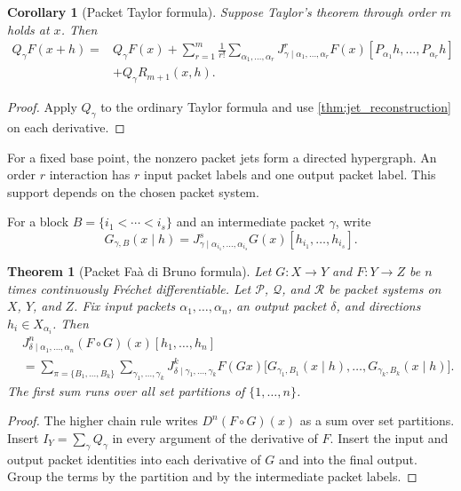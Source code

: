 \documentclass{aomart}
\newtheorem{theorem}{Theorem}[section]
\newtheorem{corollary}[corollary]{Corollary}
\theoremstyle{definition}
\theoremstyle{remark}
\newcommand{\Pcal}{\mathcal P}
\newcommand{\Qcal}{\mathcal Q}
\newcommand{\Rcal}{\mathcal R}
\begin{document}
\begin{corollary}[Packet Taylor formula]\label{cor:packet_taylor}
Suppose Taylor's theorem through order $m$ holds at $x$.  Then
\[
\begin{aligned}
Q_\gamma F(x+h)
={}&Q_\gamma F(x)
+
\sum_{r=1}^{m}\frac1{r!}
\sum_{\alpha_1,\ldots,\alpha_r}
J^{r}_{\gamma\mid\alpha_1,\ldots,\alpha_r}F(x)
[P_{\alpha_1}h,\ldots,P_{\alpha_r}h]\\
&+Q_\gamma R_{m+1}(x,h).
\end{aligned}
\]
\end{corollary}

\begin{proof}
Apply $Q_\gamma$ to the ordinary Taylor formula and use \cref{thm:jet_reconstruction} on each derivative.
\end{proof}

For a fixed base point, the nonzero packet jets form a directed hypergraph.  An order $r$ interaction has $r$ input packet labels and one output packet label.  This support depends on the chosen packet system.

For a block $B=\{i_1<\cdots<i_s\}$ and an intermediate packet $\gamma$, write
\[
G_{\gamma,B}(x\mid h)
=
J^s_{\gamma\mid\alpha_{i_1},\ldots,\alpha_{i_s}}G(x)
[h_{i_1},\ldots,h_{i_s}].
\]

\begin{theorem}[Packet Fa\`a di Bruno formula]\label{thm:packet_faa}
Let $G:X\to Y$ and $F:Y\to Z$ be $n$ times continuously Fr\'echet differentiable.  Let $\Pcal$, $\Qcal$, and $\Rcal$ be packet systems on $X$, $Y$, and $Z$.  Fix input packets $\alpha_1,\ldots,\alpha_n$, an output packet $\delta$, and directions $h_i\in X_{\alpha_i}$.  Then
\[
\begin{aligned}
&J^{n}_{\delta\mid\alpha_1,\ldots,\alpha_n}(F\circ G)(x)
[h_1,\ldots,h_n]\\
&=
\sum_{\pi=\{B_1,\ldots,B_k\}}
\sum_{\gamma_1,\ldots,\gamma_k}
J^{k}_{\delta\mid\gamma_1,\ldots,\gamma_k}F(Gx)
\big[
G_{\gamma_1,B_1}(x\mid h),\ldots,
G_{\gamma_k,B_k}(x\mid h)
\big].
\end{aligned}
\]
The first sum runs over all set partitions of $\{1,\ldots,n\}$.
\end{theorem}

\begin{proof}
The higher chain rule writes $D^n(F\circ G)(x)$ as a sum over set partitions.  Insert $I_Y=\sum_\gamma Q_\gamma$ in every argument of the derivative of $F$.  Insert the input and output packet identities into each derivative of $G$ and into the final output.  Group the terms by the partition and by the intermediate packet labels.
\end{proof}
\end{document}
